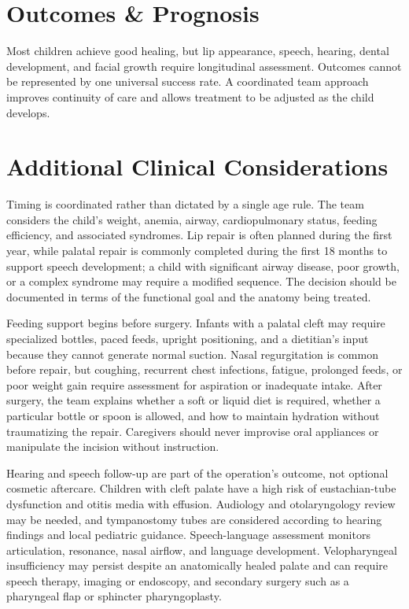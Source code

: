 \section*{Outcomes \& Prognosis}
Most children achieve good healing, but lip appearance, speech, hearing, dental development, and facial growth require longitudinal assessment. Outcomes cannot be represented by one universal success rate. A coordinated team approach improves continuity of care and allows treatment to be adjusted as the child develops.

\section*{Additional Clinical Considerations}
Timing is coordinated rather than dictated by a single age rule. The team considers the child's weight, anemia, airway, cardiopulmonary status, feeding efficiency, and associated syndromes. Lip repair is often planned during the first year, while palatal repair is commonly completed during the first 18 months to support speech development; a child with significant airway disease, poor growth, or a complex syndrome may require a modified sequence. The decision should be documented in terms of the functional goal and the anatomy being treated.

Feeding support begins before surgery. Infants with a palatal cleft may require specialized bottles, paced feeds, upright positioning, and a dietitian's input because they cannot generate normal suction. Nasal regurgitation is common before repair, but coughing, recurrent chest infections, fatigue, prolonged feeds, or poor weight gain require assessment for aspiration or inadequate intake. After surgery, the team explains whether a soft or liquid diet is required, whether a particular bottle or spoon is allowed, and how to maintain hydration without traumatizing the repair. Caregivers should never improvise oral appliances or manipulate the incision without instruction.

Hearing and speech follow-up are part of the operation's outcome, not optional cosmetic aftercare. Children with cleft palate have a high risk of eustachian-tube dysfunction and otitis media with effusion. Audiology and otolaryngology review may be needed, and tympanostomy tubes are considered according to hearing findings and local pediatric guidance. Speech-language assessment monitors articulation, resonance, nasal airflow, and language development. Velopharyngeal insufficiency may persist despite an anatomically healed palate and can require speech therapy, imaging or endoscopy, and secondary surgery such as a pharyngeal flap or sphincter pharyngoplasty.

